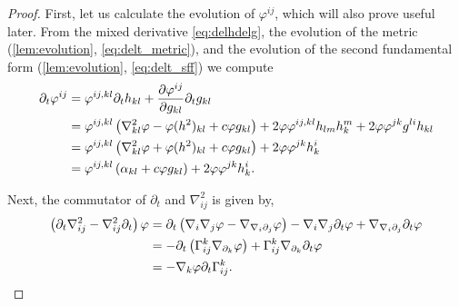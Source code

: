 \documentclass{amsart}
\begin{document}
\begin{proof}
First, let us calculate the evolution of \(\varphi^{ij}\), which will also prove useful later. From the mixed derivative \cref{eq:delhdelg}, the evolution of the metric (\cref{lem:evolution}, \cref{eq:delt_metric}), and the evolution of the second fundamental form (\cref{lem:evolution}, \cref{eq:delt_sff}) we compute
\begin{equation}
\label{eq:deltBox}
\begin{split}
\partial_{t} \varphi^{ij} &= \varphi^{ij,kl} \partial_t h_{kl} + \frac{\partial\varphi^{ij}}{\partial g_{kl}} \partial_t g_{kl} \\
&= \varphi^{ij,kl} \left(\nabla^2_{kl} \varphi - \varphi(h^2)_{kl} + c \varphi g_{kl}\right) + 2\varphi \varphi^{ij,kl} h_{lm}h^{m}_{k} + 2\varphi\varphi^{jk}g^{li}h_{kl} \\
&= \varphi^{ij,kl} \left(\nabla^2_{kl} \varphi + \varphi(h^2)_{kl} + c \varphi g_{kl}\right) + 2\varphi\varphi^{jk}h^{i}_{k} \\
&= \varphi^{ij,kl} \left(\alpha_{kl} + c \varphi g_{kl}\right) + 2\varphi\varphi^{jk}h^{i}_{k}.
\end{split}
\end{equation}

Next, the commutator of \(\partial_t\) and \(\nabla^2_{ij}\) is given by,
\begin{equation}
\label{eq:deltnabla2}
\begin{split}
\left(\partial_{t}\nabla^2_{ij} - \nabla^2_{ij}\partial_{t}\right) \varphi &= \partial_t \left(\nabla_i \nabla_j \varphi - \nabla_{\nabla_i \partial_j} \varphi\right) - \nabla_i \nabla_j \partial_t \varphi + \nabla_{\nabla_i \partial_j} \partial_t \varphi \\
&= - \partial_t \left(\Gamma_{ij}^k \nabla_{\partial_k} \varphi\right) + \Gamma_{ij}^k \nabla_{\partial_k} \partial_t \varphi \\
&= - \nabla_k \varphi \partial_t \Gamma_{ij}^k.
\end{split}
\end{equation}


\end{proof}
\end{document}
